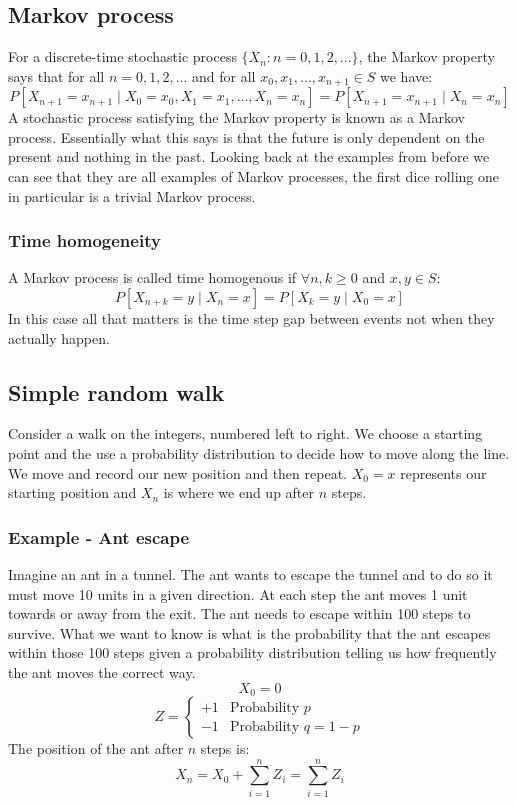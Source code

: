 \documentclass[12pt]{article}
\begin{document}
\subsection*{Markov process}
For a discrete-time stochastic process \(\{X_n:n=0,1,2,...\}\), the Markov property says that for all \(n=0,1,2,...\) and for all \(x_0,x_1,...,x_{n+1}\in S\) we have:
\[P[X_{n+1}=x_{n+1}\mid X_0=x_0, X_1=x_1,\dots,X_n=x_n]=P[X_{n+1}=x_{n+1}\mid X_n=x_n]\]
A stochastic process satisfying the Markov property is known as a Markov process. Essentially what this says is that the future is only dependent on the present and nothing in the past. Looking back at the examples from before we can see that they are all examples of Markov processes, the first dice rolling one in particular is a trivial Markov process.
\subsubsection*{Time homogeneity}
A Markov process is called time homogenous if \(\forall n,k\geq 0\) and \(x,y\in S\):
\[P[X_{n+k}=y\mid X_n=x]=P[X_k=y\mid X_0=x]\]
In this case all that matters is the time step gap between events not when they actually happen.
\subsection*{Simple random walk}
Consider a walk on the integers, numbered left to right. We choose a starting point and the use a probability distribution to decide how to move along the line. We move and record our new position and then repeat. \(X_0=x\) represents our starting position and \(X_n\) is where we end up after \(n\) steps.
\subsubsection*{Example - Ant escape}
Imagine an ant in a tunnel. The ant wants to escape the tunnel and to do so it must move 10 units in a given direction. At each step the ant moves 1 unit towards or away from the exit. The ant needs to escape within 100 steps to survive. What we want to know is what is the probability that the ant escapes within those 100 steps given a probability distribution telling us how frequently the ant moves the correct way.
\[X_0=0\]
\[Z=\begin{cases}
    +1 & \text{Probability }p \\
    -1 & \text{Probability }q=1-p
\end{cases}\]
The position of the ant after \(n\) steps is:
\[X_n=X_0+\sum^n_{i=1}Z_i=\sum^n_{i=1}Z_i\]
\end{document}
